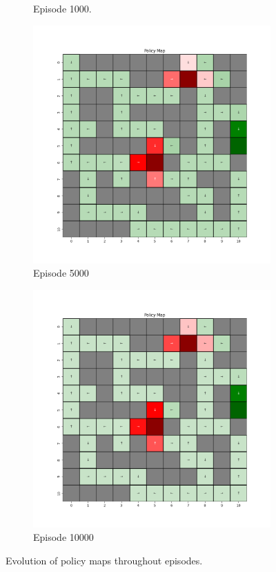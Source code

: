 \documentclass{assignment}
\begin{document}
\begin{figure}[H]
\begin{subfigure}{0.3\textwidth}
    \caption{Episode 1000.}
    \end{subfigure}\hfill
    \begin{subfigure}{0.3\textwidth}
        \includegraphics[width=\textwidth]{figures/policy_td/gamma_sweep/policy_alpha_0.1_gamma_0.1_epsilon_0.2_iteration_5000.png}
    \caption{Episode 5000}
    \end{subfigure}\hfill
    \begin{subfigure}{0.3\textwidth}
        \includegraphics[width=\textwidth]{figures/policy_td/gamma_sweep/policy_alpha_0.1_gamma_0.1_epsilon_0.2_iteration_10000.png}
    \caption{Episode 10000}
    \end{subfigure}
    \caption{Evolution of policy maps throughout episodes.}
    \label{fig:gamma_0.1_td_learning_policy}
\end{figure}
\end{document}
